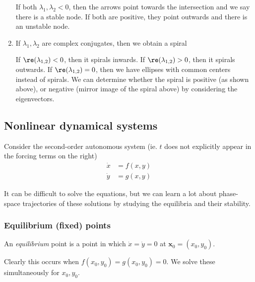 \documentclass[a4paper]{article}
\begin{document}
\begin{enumerate}
        If both $\lambda_1, \lambda_2 < 0$, then the arrows point towards the intersection and we say there is a stable node. If both are positive, they point outwards and there is an unstable node.

      \item If $\lambda_1, \lambda_2$ are complex conjugates, then we obtain a spiral

        \begin{center}
        \end{center}

        If $\re (\lambda_{1, 2}) < 0$, then it spirals inwards. If $\re (\lambda_{1, 2}) > 0$, then it spirals outwards. If $\re (\lambda_{1, 2}) = 0$, then we have ellipses with common centers instead of spirals. We can determine whether the spiral is positive (as shown above), or negative (mirror image of the spiral above) by considering the eigenvectors.
    \end{enumerate}

    \subsection{Nonlinear dynamical systems}
    Consider the second-order autonomous system (ie. $t$ does not explicitly appear in the forcing terms on the right)
    \begin{align*}
      \dot x &= f(x, y)\\
      \dot y &= g(x, y)
    \end{align*}

    It can be difficult to solve the equations, but we can learn a lot about phase-space trajectories of these solutions by studying the equilibria and their stability.

    \subsubsection{Equilibrium (fixed) points}
    \begin{defi}
      An \emph{equilibrium} point is a point in which $\dot x = \dot y = 0$ at $\mathbf{x}_0 = (x_0, y_0)$.
    \end{defi}

    Clearly this occurs when $f(x_0, y_0) = g(x_0, y_0) = 0$. We solve these simultaneously for $x_0, y_0$.
\end{document}
